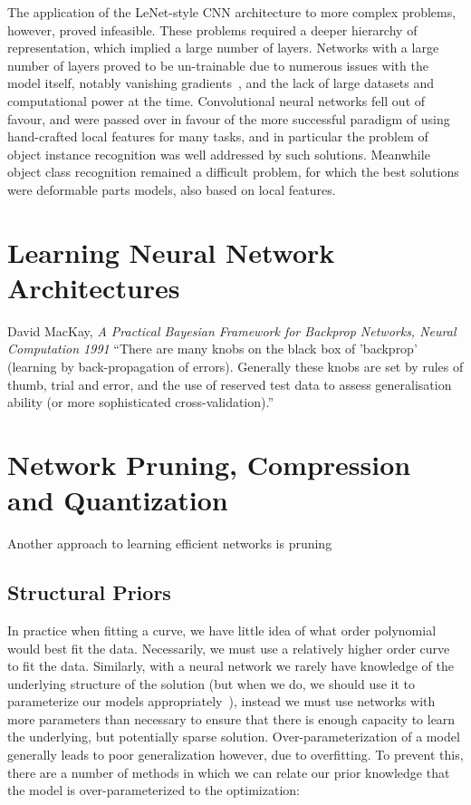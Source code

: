 \documentclass[thesis]{subfiles}
\begin{document}
	The application of the LeNet-style CNN architecture to more complex problems, however, proved infeasible. These problems required a deeper hierarchy of representation, which implied a large number of layers. Networks with a large number of layers proved to be un-trainable due to numerous issues with the model itself, notably vanishing gradients~\citep{hochreiter1991untersuchungen}, and the lack of large datasets and computational power at the time. Convolutional neural networks fell out of favour, and were passed over in favour of the more successful paradigm of using hand-crafted local features for many tasks, and in particular the problem of object instance recognition was well addressed by such solutions. Meanwhile object class recognition remained a difficult problem, for which the best solutions were deformable parts models, also based on local features.
	
	
	\section{Learning Neural Network Architectures}
	\begin{chapquote}{David MacKay, \textit{A Practical Bayesian Framework for Backprop Networks, Neural Computation 1991}}
		``There are many knobs on the black box of 'backprop' (learning by back-propagation of
		errors). Generally these knobs are set by rules of thumb, trial and error, and the use of reserved test data to assess generalisation ability (or more sophisticated cross-validation).''
	\end{chapquote}
	
	\citet{mezard1989learning,MacKay91,mackay1992practical}
	
	\section{Network Pruning, Compression and Quantization}
	Another approach to learning efficient networks is pruning
	\citet{lecun1989optimal,sietsma1988neural,Xing2009,journals/corr/HanMD15,ullrich2017soft,}
	
	
	\subsection{Structural Priors}
	In practice when fitting a curve, we have little idea of what order polynomial would best fit the data. Necessarily, we must use a relatively higher order curve to fit the data. Similarly, with a neural network we rarely have knowledge of the underlying structure of the solution (but when we do, we should use it to parameterize our models appropriately~\citep{jain2016structural}), instead we must use networks with more parameters than necessary to ensure that there is enough capacity to learn the underlying, but potentially sparse solution. Over-parameterization of a model generally leads to poor generalization however, due to overfitting. To prevent this, there are a number of methods in which we can relate our prior knowledge that the model is over-parameterized to the optimization:
	
\end{document}
